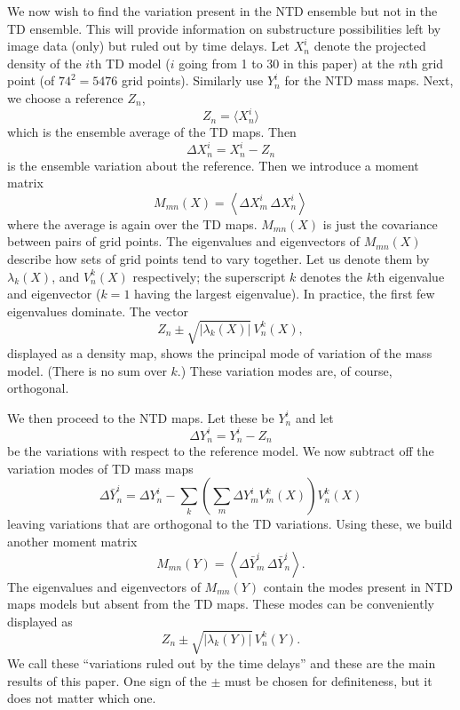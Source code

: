 \documentclass[
  11pt,
  twoside,
  openright,
  titlepage,
  headings=optiontoheadandtoc
]{scrbook}
\begin{document}
We now wish to find the variation present in the NTD ensemble but not
in the TD ensemble.  This will provide information on substructure
possibilities left by image data (only) but ruled out by time delays.
Let $X_n^i$ denote the projected density of the $i$th TD model ($i$
going from 1 to 30 in this paper) at the $n$th grid point (of
$74^2=5476$ grid points).  Similarly use $Y_n^i$ for the NTD mass
maps.  Next, we choose a reference $Z_n$,
\begin{equation} \label{p4:eq:refmodel}
  Z_n = \langle X_n^i \rangle
\end{equation}
which is the ensemble average of the TD maps.  Then
\begin{equation}
  \Delta X_n^i = X_n^i - Z_n
\end{equation}
is the ensemble variation about the reference.  Then we introduce
a moment matrix
\begin{equation}
  M_{mn}(X) = \left\langle \Delta X_m^i \, \Delta X_n^i \right\rangle
\end{equation}
where the average is again over the TD maps.  $M_{mn}(X)$ is just the
covariance between pairs of grid points.  The eigenvalues and
eigenvectors of $M_{mn}(X)$ describe how sets of grid points tend to
vary together.  Let us denote them by $\lambda_k(X)$, and $V_n^k(X)$
respectively; the superscript $k$ denotes the $k$th eigenvalue and
eigenvector ($k=1$ having the largest eigenvalue).  In practice, the
first few eigenvalues dominate.  The vector
\begin{equation}\label{p4:eq:TD}
   Z_n \pm \sqrt{|\lambda_k(X)|} \, V_n^k(X),
\end{equation}
displayed as a density map, shows the principal mode of variation of
the mass model.  (There is no sum over $k$.)  These variation modes
are, of course, orthogonal.

We then proceed to the NTD maps. Let these be $Y^i_n$ and let
\begin{equation}
  \Delta Y_n^i = Y_n^i - Z_n
\end{equation}
be the variations with respect to the reference model.  We now
subtract off the variation modes of TD mass maps
\begin{equation}
   \Delta \bar Y_n^i = \Delta Y_n^i - \sum_{k}
   \left( {\textstyle\sum_m} \Delta Y^i_m V_m^k(X) \right) V_n^k(X)
\end{equation}
leaving variations that are orthogonal to the TD
variations.  Using these, we build another moment matrix
\begin{equation}
  M_{mn}(Y) = \left\langle \Delta \bar Y_m^i \, \Delta \bar Y_n^i \right\rangle.
\end{equation}
The eigenvalues and eigenvectors of $M_{mn}(Y)$ contain the modes
present in NTD maps models but absent from the TD maps.  These modes
can be conveniently displayed as
\begin{equation}\label{p4:eq:NTD}
   Z_n \pm \sqrt{|\lambda_k(Y)|} \, V_n^k(Y).
\end{equation}
We call these ``variations ruled out by the time delays'' and these
are the main results of this paper.  One sign of the $\pm$ must be
chosen for definiteness, but it does not matter which one.
\end{document}
